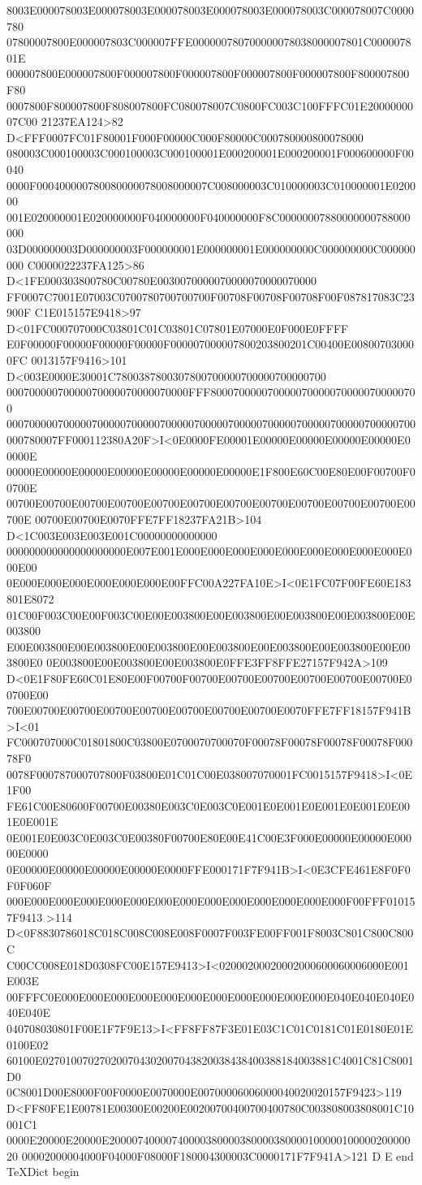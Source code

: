 8003E000078003E000078003E000078003E000078003E000078003C000078007C0000780
07800007800E000007803C000007FFE000000780700000078038000007801C000007801E
000007800E000007800F000007800F000007800F000007800F000007800F800007800F80
0007800F800007800F808007800FC080078007C0800FC003C100FFFC01E2000000007C00
21237EA124>82 D<FFF0007FC01F80001F000F00000C000F80000C000780000800078000
080003C000100003C000100003C000100001E000200001E000200001F000600000F00040
0000F000400000780080000078008000007C008000003C010000003C010000001E020000
001E020000001E020000000F040000000F040000000F8C00000007880000000788000000
03D000000003D000000003F000000001E000000001E000000000C000000000C000000000
C0000022237FA125>86 D<1FE000303800780C00780E0030070000070000070000070000
FF0007C7001E07003C0700780700700700F00708F00708F00708F00F087817083C23900F
C1E015157E9418>97 D<01FC000707000C03801C01C03801C07801E07000E0F000E0FFFF
E0F00000F00000F00000F00000F000007000007800203800201C00400E008007030000FC
0013157F9416>101 D<003E0000E30001C7800387800307800700000700000700000700
00070000070000070000070000070000FFF8000700000700000700000700000700000700
000700000700000700000700000700000700000700000700000700000700000700000700
000780007FF000112380A20F>I<0E0000FE00001E00000E00000E00000E00000E00000E
00000E00000E00000E00000E00000E00000E00000E1F800E60C00E80E00F00700F00700E
00700E00700E00700E00700E00700E00700E00700E00700E00700E00700E00700E00700E
00700E00700E0070FFE7FF18237FA21B>104 D<1C003E003E003E001C00000000000000
000000000000000000000E007E001E000E000E000E000E000E000E000E000E000E000E00
0E000E000E000E000E000E000E00FFC00A227FA10E>I<0E1FC07F00FE60E183801E8072
01C00F003C00E00F003C00E00E003800E00E003800E00E003800E00E003800E00E003800
E00E003800E00E003800E00E003800E00E003800E00E003800E00E003800E00E003800E0
0E003800E00E003800E00E003800E0FFE3FF8FFE27157F942A>109
D<0E1F80FE60C01E80E00F00700F00700E00700E00700E00700E00700E00700E00700E00
700E00700E00700E00700E00700E00700E00700E00700E0070FFE7FF18157F941B>I<01
FC000707000C01801800C03800E0700070700070F00078F00078F00078F00078F00078F0
0078F000787000707800F03800E01C01C00E038007070001FC0015157F9418>I<0E1F00
FE61C00E80600F00700E00380E003C0E003C0E001E0E001E0E001E0E001E0E001E0E001E
0E001E0E003C0E003C0E00380F00700E80E00E41C00E3F000E00000E00000E00000E0000
0E00000E00000E00000E00000E0000FFE000171F7F941B>I<0E3CFE461E8F0F0F0F060F
000E000E000E000E000E000E000E000E000E000E000E000E000E000F00FFF010157F9413
>114 D<0F8830786018C018C008C008E008F0007F003FE00FF001F8003C801C800C800C
C00CC008E018D0308FC00E157E9413>I<02000200020002000600060006000E001E003E
00FFFC0E000E000E000E000E000E000E000E000E000E000E000E040E040E040E040E040E
040708030801F00E1F7F9E13>I<FF8FF87F3E01E03C1C01C0181C01E0180E01E0100E02
60100E027010070270200704302007043820038438400388184003881C4001C81C8001D0
0C8001D00E8000F00F0000E0070000E00700006006000040020020157F9423>119
D<FF80FE1E00781E00300E00200E00200700400700400780C003808003808001C10001C1
0000E20000E20000E2000074000074000038000038000038000010000010000020000020
00002000004000F04000F08000F180004300003C0000171F7F941A>121
D E
end
TeXDict begin


